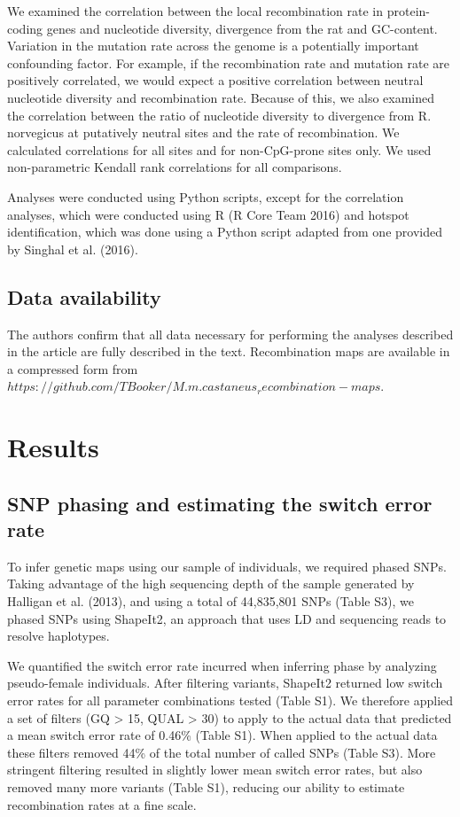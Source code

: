 We examined the correlation between the local recombination rate in protein-coding genes and nucleotide diversity, divergence from the rat and GC-content. Variation in the mutation rate across the genome is a potentially important confounding factor. For example, if the recombination rate and mutation rate are positively correlated, we would expect a positive correlation between neutral nucleotide diversity and recombination rate. Because of this, we also examined the correlation between the ratio of nucleotide diversity to divergence from R. norvegicus at putatively neutral sites and the rate of recombination. We calculated correlations for all sites and for non-CpG-prone sites only. We used non-parametric Kendall rank correlations for all comparisons.

Analyses were conducted using Python scripts, except for the correlation analyses, which were conducted using R (R Core Team 2016) and hotspot identification, which was done using a Python script adapted from one provided by Singhal et al. (2016). 

\subsection{Data availability}

	The authors confirm that all data necessary for performing the analyses described in the article are fully described in the text. Recombination maps are available in a compressed form from $https://github.com/TBooker/M.m.castaneus_recombination-maps$.

\section{Results}
 
\subsection{SNP phasing and estimating the switch error rate}
 
To infer genetic maps using our sample of individuals, we required phased SNPs. Taking advantage of the high sequencing depth of the sample generated by Halligan et al. (2013), and using a total of 44,835,801 SNPs (Table S3), we phased SNPs using ShapeIt2, an approach that uses LD and sequencing reads to resolve haplotypes. 
 
We quantified the switch error rate incurred when inferring phase by analyzing pseudo-female individuals. After filtering variants, ShapeIt2 returned low switch error rates for all parameter combinations tested (Table S1). We therefore applied a set of filters (GQ > 15, QUAL > 30) to apply to the actual data that predicted a mean switch error rate of 0.46\% (Table S1). When applied to the actual data these filters removed 44\% of the total number of called SNPs (Table S3). More stringent filtering resulted in slightly lower mean switch error rates, but also removed many more variants (Table S1), reducing our ability to estimate recombination rates at a fine scale.
 
